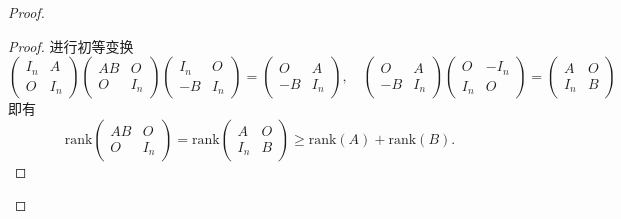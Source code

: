 \documentclass{article}
\begin{document}
\begin{enumerate}
\begin{proof}
\begin{enumerate}
\begin{proof}
                进行初等变换
                \[
                    \begin{pmatrix}
                        I_n & A\\
                        O & I_n
                    \end{pmatrix}
                    \begin{pmatrix}
                        AB & O\\
                        O & I_n
                    \end{pmatrix}
                    \begin{pmatrix}
                        I_n & O\\
                        -B & I_n
                    \end{pmatrix}
                    =
                    \begin{pmatrix}
                        O & A\\
                        -B & I_n
                    \end{pmatrix},
                    \quad
                    \begin{pmatrix}
                        O & A\\
                        -B & I_n
                    \end{pmatrix}
                    \begin{pmatrix}
                        O & -I_n\\
                        I_n & O
                    \end{pmatrix}
                    =
                    \begin{pmatrix}
                        A & O\\
                        I_n & B
                    \end{pmatrix}
                \]
                即有
                \[
                    \mbox{rank}\begin{pmatrix}
                        AB & O\\
                        O & I_n
                    \end{pmatrix}=
                    \mbox{rank}\begin{pmatrix}
                        A & O\\
                        I_n & B
                    \end{pmatrix}
                    \geqslant \mbox{rank}(A)+\mbox{rank}(B).
                \]
                \end{proof}

\end{enumerate}
\end{proof}
\end{enumerate}
\end{document}
